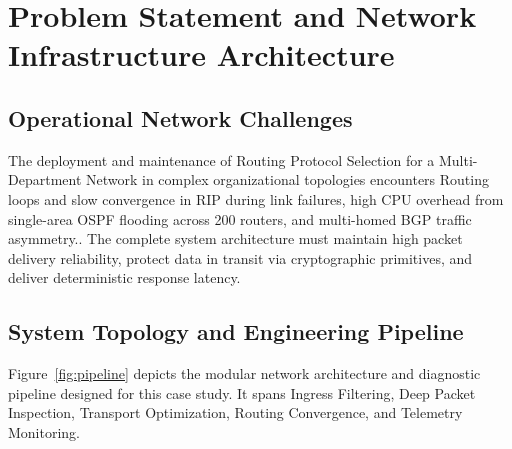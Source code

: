 \section{Problem Statement and Network Infrastructure Architecture}

\subsection{Operational Network Challenges}
The deployment and maintenance of Routing Protocol Selection for a Multi-Department Network in complex organizational topologies encounters Routing loops and slow convergence in RIP during link failures, high CPU overhead from single-area OSPF flooding across 200 routers, and multi-homed BGP traffic asymmetry.. The complete system architecture must maintain high packet delivery reliability, protect data in transit via cryptographic primitives, and deliver deterministic response latency.

\subsection{System Topology and Engineering Pipeline}
Figure~\ref{fig:pipeline} depicts the modular network architecture and diagnostic pipeline designed for this case study. It spans Ingress Filtering, Deep Packet Inspection, Transport Optimization, Routing Convergence, and Telemetry Monitoring.

